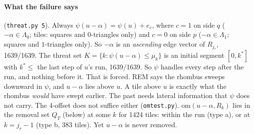\documentclass[11pt]{article}
\theoremstyle{definition}\newtheorem{definition}[theorem]{Definition}\newtheorem{remark}[theorem]{Remark}
\begin{document}
\paragraph{What the failure says} (\texttt{threat.py 5}). Always $\psi(u-\alpha)=\psi(u)+e_c$, where $c=1$ on side $q$ ($-\alpha\in\Lambda_0$; tiles: squares and $0$-triangles only) and $c=0$ on side $p$ ($-\alpha\in\Lambda_1$; squares and $1$-triangles only). So $-\alpha$ is an \emph{ascending} edge vector of $R_{j_r}$, 1639/1639.
The threat set $K=\{k:\psi(u-\alpha)\le\mu_k\}$ is an initial segment $[0,k^*]$ with $k^*\le$ the last step of $u$'s run, 1639/1639. So $\psi$ handles every step after the run, and nothing before it.
That is forced. REM says the rhombus sweeps downward in $\psi$, and $u-\alpha$ lies above $u$. A tile above $u$ is exactly what the rhombus \emph{would} have swept earlier. The past needs lateral information that $\psi$ does not carry.
The 4-offset does not suffice either (\texttt{omtest.py}). $\mathrm{om}(u-\alpha,R_k)$ lies in the removal set $Q_T$ (below) at some $k$ for 1424 tiles: within the run (type a), or at $k=j_r-1$ (type b, 383 tiles). Yet $u-\alpha$ is never removed.
\end{document}
